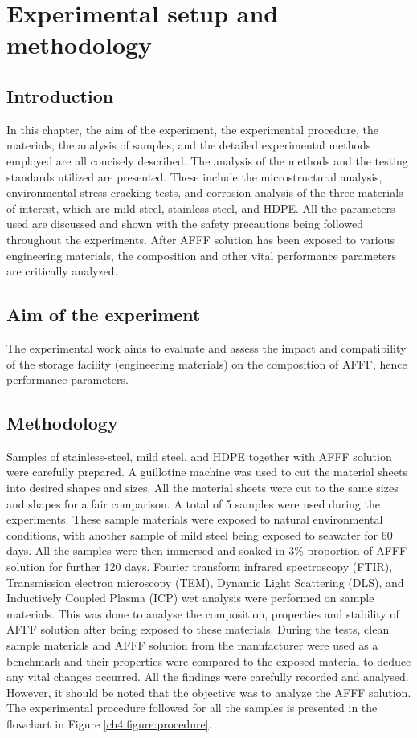 \chapter{Experimental setup and methodology}
\section{Introduction}
In this chapter, the aim of the experiment, the experimental procedure, the materials, the analysis of samples, and the detailed experimental methods employed are all concisely described. The analysis of the methods and the testing standards utilized are presented. These include the microstructural analysis, environmental stress cracking tests, and corrosion analysis of the three materials of interest, which are mild steel, stainless steel, and HDPE. All the parameters used are discussed and shown with the safety precautions being followed throughout the experiments. After AFFF solution has been exposed to various engineering materials, the composition and other vital performance parameters are critically analyzed.

\section{Aim of the experiment}
The experimental work aims to evaluate and assess the impact and compatibility of the storage facility (engineering materials) on the composition of AFFF, hence performance parameters. 

\section{Methodology}
Samples of stainless-steel, mild steel, and HDPE together with AFFF solution were carefully prepared. A guillotine machine was used to cut the material sheets into desired shapes and sizes. All the material sheets were cut to the same sizes and shapes for a fair comparison. A total of 5 samples were used during the experiments. These sample materials were exposed to natural environmental conditions, with another sample of mild steel being exposed to seawater for 60 days. All the samples were then immersed and soaked in 3\% proportion of AFFF solution for further 120 days. Fourier transform infrared spectroscopy (FTIR), Transmission electron microscopy (TEM), Dynamic Light Scattering (DLS), and Inductively Coupled Plasma (ICP) wet analysis were performed on sample materials. This was done to analyse the composition, properties and stability of AFFF solution after being exposed to these materials. 
During the tests, clean sample materials and AFFF solution from the manufacturer were used as a benchmark and their properties were compared to the exposed material to deduce any vital changes occurred. All the findings were carefully recorded and analysed. However, it should be noted that the objective was to analyze the AFFF solution. The experimental procedure followed for all the samples is presented in the flowchart in Figure \ref{ch4:figure:procedure}. 

